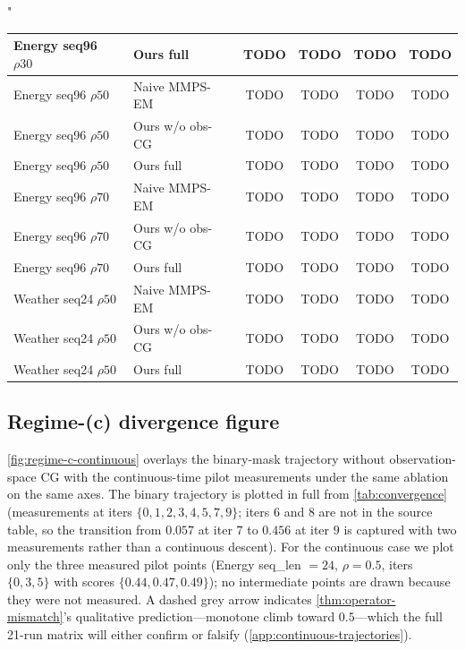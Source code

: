 "\documentclass{article}
\theoremstyle{plain}
\theoremstyle{definition}
\theoremstyle{remark}
\begin{document}
\begin{table}[h]
{\begin{tabular}{l|l|cccc}
Energy seq96 $\rho30$ & Ours full       & TODO & TODO & TODO & TODO \\
\midrule
Energy seq96 $\rho50$ & Naive MMPS-EM & TODO & TODO & TODO & TODO \\
Energy seq96 $\rho50$ & Ours w/o obs-CG & TODO & TODO & TODO & TODO \\
Energy seq96 $\rho50$ & Ours full       & TODO & TODO & TODO & TODO \\
\midrule
Energy seq96 $\rho70$ & Naive MMPS-EM & TODO & TODO & TODO & TODO \\
Energy seq96 $\rho70$ & Ours w/o obs-CG & TODO & TODO & TODO & TODO \\
Energy seq96 $\rho70$ & Ours full       & TODO & TODO & TODO & TODO \\
\midrule
Weather seq24 $\rho50$ & Naive MMPS-EM & TODO & TODO & TODO & TODO \\
Weather seq24 $\rho50$ & Ours w/o obs-CG & TODO & TODO & TODO & TODO \\
Weather seq24 $\rho50$ & Ours full       & TODO & TODO & TODO & TODO \\
\bottomrule
\end{tabular}
}
\end{table}

\subsection{Regime-(c) divergence figure}
\label{app:continuous-figure}

\cref{fig:regime-c-continuous} overlays the binary-mask trajectory without observation-space CG with the continuous-time pilot measurements under the same ablation on the same axes. The binary trajectory is plotted in full from \cref{tab:convergence} (measurements at iters $\{0,1,2,3,4,5,7,9\}$; iters $6$ and $8$ are not in the source table, so the transition from $0.057$ at iter $7$ to $0.456$ at iter $9$ is captured with two measurements rather than a continuous descent). For the continuous case we plot only the three measured pilot points (Energy seq\_len $=24$, $\rho=0.5$, iters $\{0, 3, 5\}$ with scores $\{0.44, 0.47, 0.49\}$); no intermediate points are drawn because they were not measured. A dashed grey arrow indicates \cref{thm:operator-mismatch}'s qualitative prediction---monotone climb toward $0.5$---which the full 21-run matrix will either confirm or falsify (\cref{app:continuous-trajectories}).
\end{document}
